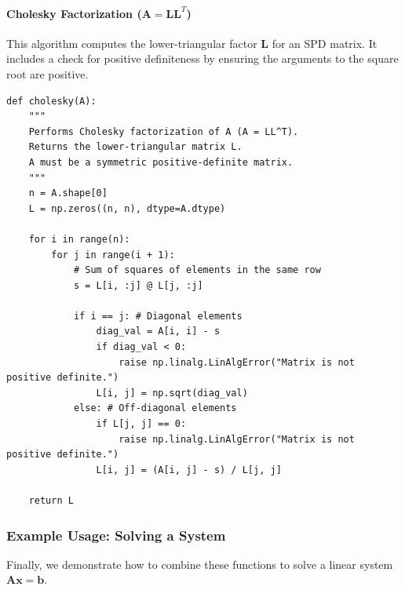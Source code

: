 \paragraph{Cholesky Factorization ($\mathbf{A} = \mathbf{L}\mathbf{L}^T$)}
This algorithm computes the lower-triangular factor $\mathbf{L}$ for an SPD matrix. It includes a check for positive definiteness by ensuring the arguments to the square root are positive.

\begin{verbatim}
def cholesky(A):
    """
    Performs Cholesky factorization of A (A = LL^T).
    Returns the lower-triangular matrix L.
    A must be a symmetric positive-definite matrix.
    """
    n = A.shape[0]
    L = np.zeros((n, n), dtype=A.dtype)

    for i in range(n):
        for j in range(i + 1):
            # Sum of squares of elements in the same row
            s = L[i, :j] @ L[j, :j]
            
            if i == j: # Diagonal elements
                diag_val = A[i, i] - s
                if diag_val < 0:
                    raise np.linalg.LinAlgError("Matrix is not positive definite.")
                L[i, j] = np.sqrt(diag_val)
            else: # Off-diagonal elements
                if L[j, j] == 0:
                    raise np.linalg.LinAlgError("Matrix is not positive definite.")
                L[i, j] = (A[i, j] - s) / L[j, j]
                
    return L
\end{verbatim}

\subsubsection*{Example Usage: Solving a System}
Finally, we demonstrate how to combine these functions to solve a linear system $\mathbf{A}\mathbf{x} = \mathbf{b}$.

